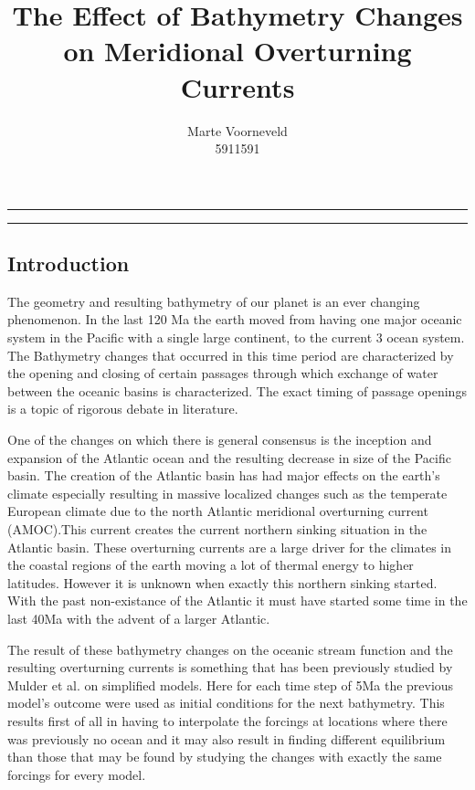 \documentclass[a4paper]{article}
\title{The Effect of Bathymetry Changes on Meridional Overturning Currents}
\author{Marte Voorneveld\\
		5911591}
\begin{document}
\maketitle
\noindent\rule{\textwidth}{1pt}
\begin{abstract}

\end{abstract}
\noindent\rule{\textwidth}{1pt}
\begin{multicols}{2}
\section{Introduction}

The geometry and resulting bathymetry of our planet is an ever changing phenomenon\cite{besse2002apparent}. In the last 120 Ma the earth moved from having one major oceanic system in the Pacific with a single large continent, to the current 3 ocean system. The Bathymetry changes that occurred in this time period are characterized by the opening and closing of certain passages through which exchange of water between the oceanic basins is characterized. The exact timing of passage openings is a topic of rigorous debate in literature\cite{Scher2006Apr}\cite{Schmidt2007Jan}.


One of the changes on which there is general consensus is the inception and expansion of the Atlantic ocean and the resulting decrease in size of the Pacific basin. The creation of the Atlantic basin has had major effects on the earth's climate especially resulting in massive localized changes such as the temperate European climate due to the north Atlantic meridional overturning current (AMOC).This current creates the current northern sinking situation in the Atlantic basin. These overturning currents are a large driver for the climates in the coastal regions of the earth moving a lot of thermal energy to higher latitudes. However it is unknown when exactly this northern sinking started. With the past non-existance of the Atlantic it must have started some time in the last 40Ma with the advent of a larger Atlantic. 

The result of these bathymetry changes on the oceanic stream function and the resulting overturning currents is something that has been previously studied by Mulder et al.\cite{Mulder2017Jul} on simplified models. Here for each time step of 5Ma the previous model's outcome were used as initial conditions for the next bathymetry. This results first of all in having to interpolate the forcings at locations where there was previously no ocean and it may also result in finding different equilibrium than those that may be found by studying the changes with exactly the same forcings for every model.


\end{multicols}
\end{document}
